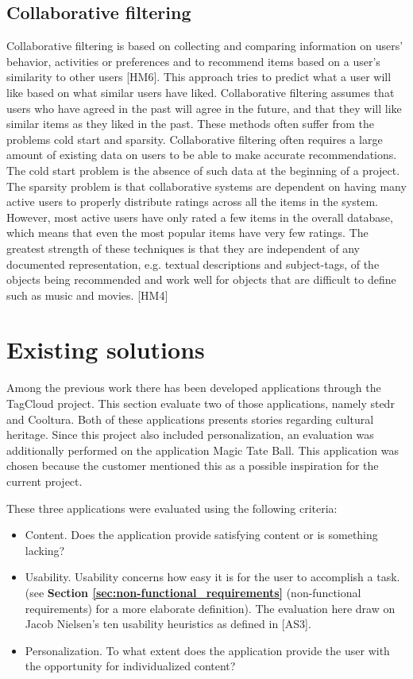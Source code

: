 \subsection{Collaborative filtering}

Collaborative filtering is based on collecting and comparing information on users’ behavior, activities or preferences and to recommend items based on a user’s similarity to other users [HM6]. This approach tries to predict what a user will like based on what similar users have liked. Collaborative filtering assumes that users who have agreed in the past will agree in the future, and that they will like similar items as they liked in the past. These methods often suffer from the problems cold start and sparsity. Collaborative filtering often requires a large amount of existing data on users to be able to make accurate recommendations. The cold start problem is the absence of such data at the beginning of a project. The sparsity problem is that collaborative systems are dependent on having many active users to properly distribute ratings across all the items in the system. However, most active users have only rated a few items in the overall database, which means that even the most popular items have very few ratings. The greatest strength of these techniques is that they are independent of any documented representation, e.g. textual descriptions and subject-tags, of the objects being recommended and work well for objects that are difficult to define such as music and movies. [HM4]

\section{Existing solutions}

Among the previous work there has been developed applications through the TagCloud project. This section evaluate two of those applications, namely stedr and Cooltura. Both of these applications presents stories regarding cultural heritage. Since this project also included personalization, an evaluation was additionally performed on the application Magic Tate Ball. This application was chosen because the customer mentioned this as a possible inspiration for the current project. \newline

These three applications were evaluated using the following criteria:
\begin{itemize}
\item Content. Does the application provide satisfying content or is something lacking?
\item Usability. Usability concerns how easy it is for the user to accomplish a task. (see \textbf{Section \ref{sec:non-functional_requirements}} (non-functional requirements) for a more elaborate definition). The evaluation here draw on Jacob Nielsen’s ten usability heuristics as defined in [AS3].  
\item Personalization. To what extent does the application provide the user with the opportunity for individualized content?
\end{itemize}

